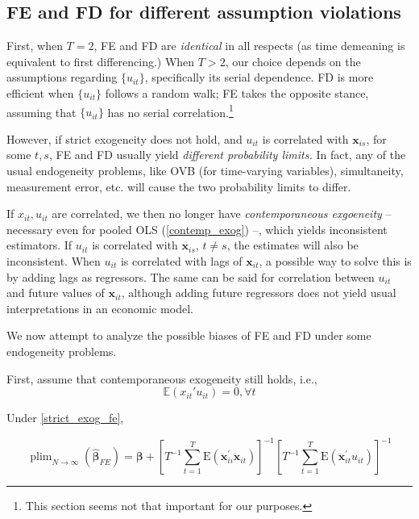 \documentclass[11pt, a4paper]{report}
\theoremstyle{plain}
\theoremstyle{plain}
\theoremstyle{remark}
\begin{document}
\subsection{FE and FD for different assumption violations}

First, when $T=2$, FE and FD are \textit{identical} in all respects (as time demeaning is equivalent to first differencing.) When $T > 2$, our choice depends on the assumptions regarding $\{u_{it}\}$, specifically its serial dependence. FD is more efficient when $\{u_{it}\}$ follows a random walk; FE takes the opposite stance, assuming that $\{u_{it}\}$ has no serial correlation.\footnote{This section seems not that important for our purposes.}

However, if strict exogeneity does not hold, and $u_{it}$ is correlated with $\mathbf{x}_{is}$, for some $t, s$, FE and FD usually yield \textit{different probability limits.} In fact, any of the usual endogeneity problems, like OVB (for time-varying variables), simultaneity, measurement error, etc. will cause the two probability limits to differ. 

If $x_{it}, u_{it}$ are correlated, we then no longer have \textit{contemporaneous exgoeneity} -- necessary even for pooled OLS (\ref{contemp_exog}) --, which yields inconsistent estimators. If $u_{it}$ is correlated with $\mathbf{x}_{is}$, $t \neq s$, the estimates will also be inconsistent. When $u_{it}$ is correlated with lags of $\mathbf{x}_{it}$, a possible way to solve this is by adding lags as regressors. The same can be said for correlation between $u_{it}$ and future values of $\mathbf{x}_{it}$, although adding future regressors does not yield usual interpretations in an economic model. 

We now attempt to analyze the possible biases of FE and FD under some endogeneity problems.

First, assume that contemporaneous exogeneity still holds, i.e., 
\begin{equation}
    \mathbb{E}(x_{it}'u_{it}) = 0, \forall t
\end{equation}

Under \ref{strict_exog_fe}, 

\begin{equation}
    \operatorname{plim}_{N \rightarrow \infty}\left(\hat{\boldsymbol{\beta}}_{F E}\right)=\boldsymbol{\beta}+\left[T^{-1} \sum_{t=1}^{T} \mathrm{E}\left(\ddot{\mathbf{x}}_{i i}^{\prime} \ddot{\mathbf{x}}_{i t}\right)\right]^{-1}\left[T^{-1} \sum_{t=1}^{T} \mathrm{E}\left(\ddot{\mathbf{x}}_{i t}^{\prime} u_{i t}\right)\right]^{-1}
    \end{equation}
\end{document}
